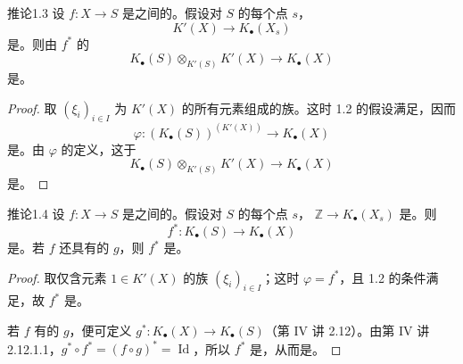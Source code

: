 \begin{SGAresult}{推论}{1.3}
设 $f:X\to S$ 是之间的。假设对 $S$ 的每个点 $s$，
\[
K'(X)\longrightarrow K_\bullet(X_s)
\]
是。则由 $f^*$ 的
\[
K_\bullet(S)\otimes_{K'(S)}K'(X)\longrightarrow K_\bullet(X)
\]
是。
\end{SGAresult}
\begin{proof}
取 $(\xi_i)_{i\in I}$ 为 $K'(X)$ 的所有元素组成的族。这时 1.2 的假设满足，因而
\[
\varphi:(K_\bullet(S))^{(K'(X))}\longrightarrow K_\bullet(X)
\]
是。由 $\varphi$ 的定义，这于
\[
K_\bullet(S)\otimes_{K'(S)}K'(X)\longrightarrow K_\bullet(X)
\]
是。
\end{proof}

\begin{SGAresult}{推论}{1.4}
设 $f:X\to S$ 是之间的。假设对 $S$ 的每个点 $s$， $\mathbb Z\to K_\bullet(X_s)$ 是。则
\[
f^*:K_\bullet(S)\longrightarrow K_\bullet(X)
\]
是。若 $f$ 还具有的 $g$，则 $f^*$ 是。
\end{SGAresult}
\begin{proof}
取仅含元素 $1\in K'(X)$ 的族 $(\xi_i)_{i\in I}$；这时 $\varphi=f^*$，且 1.2 的条件满足，故 $f^*$ 是。

若 $f$ 有的 $g$，便可定义 $g^*:K_\bullet(X)\to K_\bullet(S)$（第 IV 讲 2.12）。由第 IV 讲 2.12.1.1，$g^*\circ f^*=(f\circ g)^*=\operatorname{Id}$，所以 $f^*$ 是，从而是。
\end{proof}

